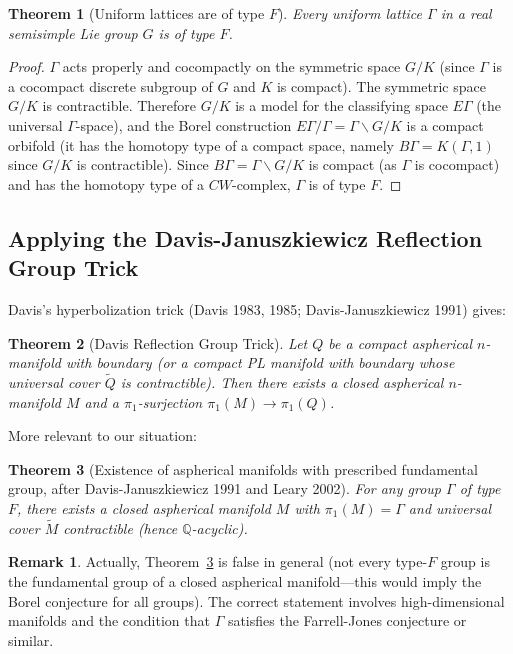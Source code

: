 \documentclass[12pt]{article}
\newtheorem{theorem}{Theorem}
\theoremstyle{definition}
\newtheorem{remark}{Remark}
\begin{document}
\begin{theorem}[Uniform lattices are of type $F$]\label{thm:typeF}
Every uniform lattice $\Gamma$ in a real semisimple Lie group $G$ is of type $F$.
\end{theorem}

\begin{proof}
$\Gamma$ acts properly and cocompactly on the symmetric space $G/K$ (since $\Gamma$ is a cocompact discrete subgroup of $G$ and $K$ is compact). The symmetric space $G/K$ is contractible. Therefore $G/K$ is a model for the classifying space $E\Gamma$ (the universal $\Gamma$-space), and the Borel construction $E\Gamma/\Gamma = \Gamma\backslash G/K$ is a compact orbifold (it has the homotopy type of a compact space, namely $B\Gamma = K(\Gamma,1)$ since $G/K$ is contractible). Since $B\Gamma = \Gamma\backslash G/K$ is compact (as $\Gamma$ is cocompact) and has the homotopy type of a $CW$-complex, $\Gamma$ is of type $F$.
\end{proof}

\subsection{Applying the Davis-Januszkiewicz Reflection Group Trick}

Davis's hyperbolization trick (Davis 1983, 1985; Davis-Januszkiewicz 1991) gives:

\begin{theorem}[Davis Reflection Group Trick]\label{thm:davis-trick}
Let $Q$ be a compact aspherical $n$-manifold with boundary (or a compact PL manifold with boundary whose universal cover $\tilde{Q}$ is contractible). Then there exists a closed aspherical $n$-manifold $M$ and a $\pi_1$-surjection $\pi_1(M)\to\pi_1(Q)$.
\end{theorem}

More relevant to our situation:

\begin{theorem}[Existence of aspherical manifolds with prescribed fundamental group, after Davis-Januszkiewicz 1991 and Leary 2002]\label{thm:leary}
For any group $\Gamma$ of type $F$, there exists a closed aspherical manifold $M$ with $\pi_1(M) = \Gamma$ and universal cover $\tilde{M}$ contractible (hence $\mathbb{Q}$-acyclic).
\end{theorem}

\begin{remark}
Actually, Theorem~\ref{thm:leary} is false in general (not every type-$F$ group is the fundamental group of a closed aspherical manifold—this would imply the Borel conjecture for all groups). The correct statement involves high-dimensional manifolds and the condition that $\Gamma$ satisfies the Farrell-Jones conjecture or similar.
\end{remark}
\end{document}
